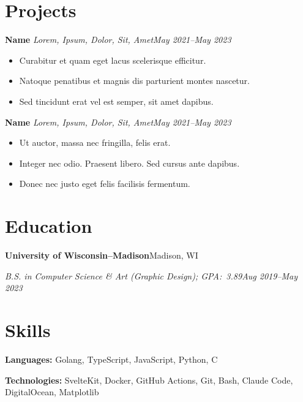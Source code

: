 \documentclass[11pt]{article}
\newcommand{\project}[3]{%
  \textbf{#1} \textbar{} \emph{#2}\hfill\emph{\small #3}\par
}
\newcommand{\education}[4]{%
  \textbf{#1}\hfill#2\par
  \emph{\small #3}\hfill\emph{\small #4}\par
  \addvspace{1.5ex}
}
\newcommand{\skill}[2]{%
  \textbf{#1:} #2\par
}
\begin{document}
\section{Projects}

\project{Name}{Lorem, Ipsum, Dolor, Sit, Amet}{May 2021--May 2023}
\begin{itemize}
  \item Curabitur et quam eget lacus scelerisque efficitur.
  \item Natoque penatibus et magnis dis parturient montes nascetur.
  \item Sed tincidunt erat vel est semper, sit amet dapibus.
\end{itemize}

\project{Name}{Lorem, Ipsum, Dolor, Sit, Amet}{May 2021--May 2023}
\begin{itemize}
  \item Ut auctor, massa nec fringilla, felis erat.
  \item Integer nec odio. Praesent libero. Sed cursus ante dapibus.
  \item Donec nec justo eget felis facilisis fermentum.
\end{itemize}

\section{Education}

\education%
{University of Wisconsin--Madison}
{Madison, WI}
{B.S. in Computer Science \& Art (Graphic Design); GPA:\ 3.89}
{Aug 2019--May 2023}

\section{Skills}

\skill{Languages}{Golang, TypeScript, JavaScript, Python, C}
\skill{Technologies}{SvelteKit, Docker, GitHub Actions, Git, Bash, Claude Code, DigitalOcean, Matplotlib}
\end{document}
